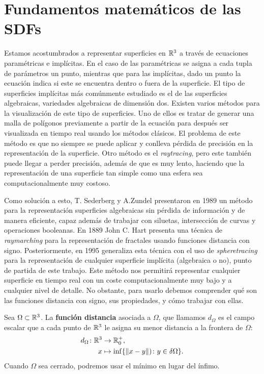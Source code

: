 \chapter{Fundamentos matemáticos de las SDFs}\label{chapter1}
Estamos acostumbrados a representar superficies en $\mathbb{R}^3$ a través de ecuaciones paramétricas e implícitas. En el caso de las paramétricas se asigna a cada tupla de parámetros un punto, mientras que para las implícitas, dado un punto la ecuación indica si este se encuentra dentro o fuera de la superficie. El tipo de superficies implícitas más comúnmente estudiado es el de las superficies algebraicas, variedades algebraicas de dimensión dos. Existen varios métodos para la visualización de este tipo de superficies. Uno de ellos es tratar de generar una malla de polígonos previamente a partir de la ecuación para después ser visualizada en tiempo real usando los métodos clásicos. El problema de este método es que no siempre se puede aplicar y conlleva pérdida de precisión en la representación de la superficie. Otro método es el \textit{raytracing}, pero este también puede llegar a perder precisión, además de que es muy lento, haciendo que la representación de una superficie tan simple como una esfera sea computacionalmente muy costoso.\newline

Como solución a esto, T. Sederberg y A.Zundel \cite{Sederberg1989ScanLD} presentaron en 1989 un método para la representación superficies algebraicas sin pérdida de información y de manera eficiente, capaz además de trabajar con siluetas, intersección de curvas y operaciones booleanas. En 1889 John C. Hart \cite{hart2} presenta una técnica de \textit{raymarching} para la representación de fractales usando funciones distancia con signo. Posteriormente, en 1995 \cite{hart} generaliza esta técnica con el uso de \textit{spheretracing} para la representación de cualquier superficie implícita (algebraica o no), punto de partida de este trabajo. Este método nos permitirá representar cualquier superficie en tiempo real con un coste computacionalmente muy bajo y a cualquier nivel de detalle. No obstante, para usarlo debemos comprender qué son las funciones distancia con signo, sus propiedades, y cómo trabajar con ellas.

\begin{definicion}\label{def:sdf}
  Sea $\Omega \subset \mathbb{R}^3$. La \textbf{función distancia} asociada a $\Omega$, que llamamos $d_{\Omega}$ es el campo escalar que a cada punto de $\mathbb{R}^3$ le asigna su menor distancia a la frontera de $\Omega$:
    \begin{align*}
          d_{\Omega} \colon \mathbb{R}^3 &\to \mathbb{R}_0^+,\\
          x &\mapsto \inf\{\Vert x-y\Vert) \colon y \in \delta\Omega\}.
    \end{align*}
    Cuando $\Omega$ sea cerrado, podremos usar el mínimo en lugar del ínfimo.
\end{definicion}

